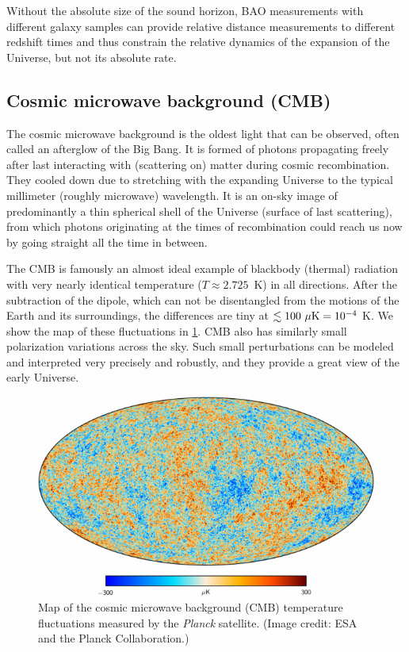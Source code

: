 Without the absolute size of the sound horizon, BAO measurements with different galaxy samples can provide relative distance measurements to different redshift times and thus constrain the relative dynamics of the expansion of the Universe, but not its absolute rate.

\subsection{Cosmic microwave background (CMB)}

The cosmic microwave background is the oldest light that can be observed, often called an afterglow of the Big Bang.
It is formed of photons propagating freely after last interacting with (scattering on) matter during cosmic recombination.
They cooled down due to stretching with the expanding Universe to the typical millimeter (roughly microwave) wavelength.
It is an on-sky image of predominantly a thin spherical shell of the Universe (surface of last scattering), from which photons originating at the times of recombination could reach us now by going straight all the time in between.

The CMB is famously an almost ideal example of blackbody (thermal) radiation with very nearly identical temperature ($T\approx 2.725$~K) in all directions.
After the subtraction of the dipole, which can not be disentangled from the motions of the Earth and its surroundings, the differences are tiny at $\lesssim 100~{\rm \mu K}=10^{-4}~$K.
We show the map of these fluctuations in \cref{fig:cmb-map}.
CMB also has similarly small polarization variations across the sky.
Such small perturbations can be modeled and interpreted very precisely and robustly, and they provide a great view of the early Universe.

\begin{figure}[htb]
    \centering
    \includegraphics[width=\textwidth]{img/planck_int_cmb_0.png}
    \caption{Map of the cosmic microwave background (CMB) temperature fluctuations measured by the {\it Planck} satellite. (Image credit: ESA and the Planck Collaboration.)}
    \label{fig:cmb-map}
\end{figure}

